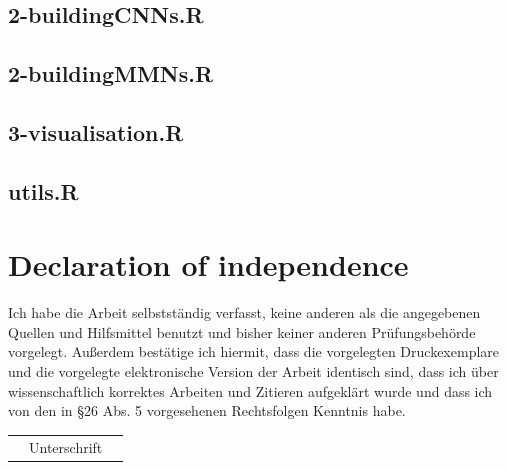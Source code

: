 \documentclass[12pt,twoside]{scrreport}
\begin{document}
\section*{2-buildingCNNs.R}

\newpage
\section*{2-buildingMMNs.R}

\newpage
\section*{3-visualisation.R}

\newpage
\section*{utils.R}

\newpage

\chapter*{Declaration of independence}
Ich habe die Arbeit selbstständig verfasst, keine anderen als die angegebenen Quellen und Hilfsmittel benutzt und bisher keiner anderen Prüfungsbehörde vorgelegt. Außerdem bestätige ich hiermit, dass die vorgelegten Druckexemplare und die vorgelegte elektronische Version der Arbeit identisch sind, dass ich über wissenschaftlich korrektes Arbeiten und Zitieren aufgeklärt wurde und dass ich von den in §26 Abs. 5 vorgesehenen Rechtsfolgen Kenntnis habe.

\vspace{2cm}
\begin{flushright}
	\renewcommand{\arraystretch}{1.3}
	\begin{tabular}{ccc}
		\hline
		\hspace*{2cm}&Unterschrift&\hspace*{2cm}\\
	\end{tabular}
\end{flushright}


\end{document}
